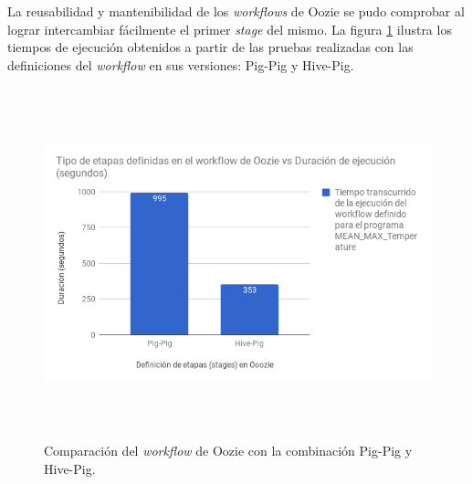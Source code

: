 La reusabilidad y mantenibilidad de los \textit{workflows} de Oozie se pudo comprobar al lograr intercambiar fácilmente el primer \textit{stage} del mismo.  La figura \ref{07_04_01} ilustra los tiempos de ejecución obtenidos a partir de las pruebas realizadas con las definiciones del \textit{workflow} en sus versiones: Pig-Pig y Hive-Pig.

\begin{figure}[H]
  \centering
      \includegraphics[width=\textwidth, height=4.0in]{fig/07/04_01}
  \caption{Comparación del \textit{workflow} de Oozie con la combinación Pig-Pig y Hive-Pig.}
  \label{07_04_01}
\end{figure}